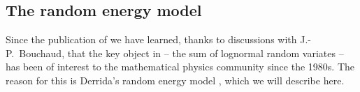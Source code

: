 %

\subsection{The random energy model}
Since the publication of \cite{PetersKlein2013} we have learned, thanks to discussions with J.-P.~Bouchaud, that the key object in  -- the sum of lognormal random variates -- has been of interest to the mathematical physics community since the 1980s. The reason for this is Derrida's random energy model \cite{Derrida1980,Derrida1981}, which we will describe here.

